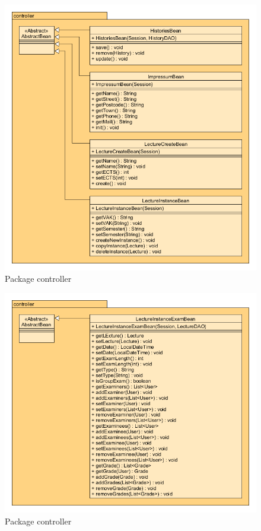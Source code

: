 \begin{figure}[H]
\includegraphics[width=\textwidth]{../UMLDiagramme/controller/gfx/4_package_controller_part_3.png}
	\caption{Package controller}
\end{figure}

\begin{figure}[H]
\includegraphics[width=\textwidth]{../UMLDiagramme/controller/gfx/4_package_controller_part_4.png}
	\caption{Package controller}
\end{figure}

